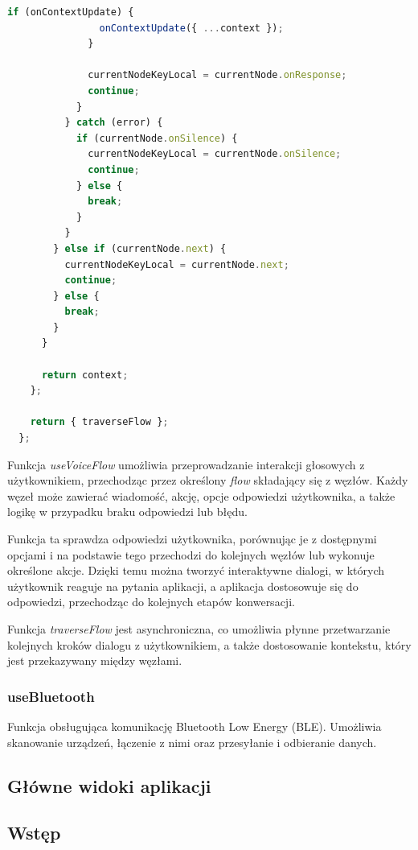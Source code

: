 \begin{lstlisting}[language=JavaScript, caption=useVoiceFlowHook, label=lst:voiceFlow]
              if (onContextUpdate) {
                onContextUpdate({ ...context });
              }

              currentNodeKeyLocal = currentNode.onResponse;
              continue;
            }
          } catch (error) {
            if (currentNode.onSilence) {
              currentNodeKeyLocal = currentNode.onSilence;
              continue;
            } else {
              break;
            }
          }
        } else if (currentNode.next) {
          currentNodeKeyLocal = currentNode.next;
          continue;
        } else {
          break;
        }
      }

      return context;
    };

    return { traverseFlow };
  };
\end{lstlisting}
    
Funkcja \textit{useVoiceFlow} umożliwia przeprowadzanie interakcji głosowych z użytkownikiem, przechodząc przez określony \textit{flow} składający się z węzłów. Każdy węzeł może zawierać wiadomość, akcję, opcje odpowiedzi użytkownika, a także logikę w przypadku braku odpowiedzi lub błędu. 

Funkcja ta sprawdza odpowiedzi użytkownika, porównując je z dostępnymi opcjami i na podstawie tego przechodzi do kolejnych węzłów lub wykonuje określone akcje. Dzięki temu można tworzyć interaktywne dialogi, w których użytkownik reaguje na pytania aplikacji, a aplikacja dostosowuje się do odpowiedzi, przechodząc do kolejnych etapów konwersacji. 

Funkcja \textit{traverseFlow} jest asynchroniczna, co umożliwia płynne przetwarzanie kolejnych kroków dialogu z użytkownikiem, a także dostosowanie kontekstu, który jest przekazywany między węzłami.

\subsubsection{useBluetooth} 

Funkcja obsługująca komunikację Bluetooth Low Energy (BLE). Umożliwia skanowanie urządzeń, łączenie z nimi oraz przesyłanie i odbieranie danych.

\subsection{Główne widoki aplikacji}

\subsection{Wstęp}

